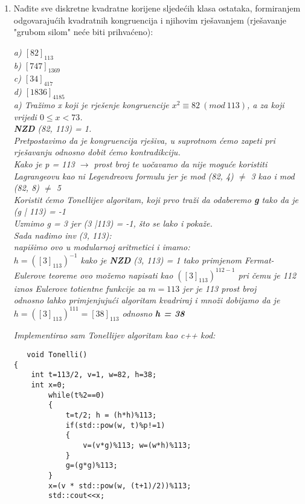 \documentclass[12pt]{article}
\begin{document}
\begin{enumerate}
\begin{center}
	    \end{center}
	    \item Nađite sve diskretne kvadratne korijene sljedećih klasa ostataka, formiranjem odgovarajućih kvadratnih kongruencija i njihovim rješavanjem (rješavanje "grubom silom" neće biti prihvaćeno):
        \begin{center}
        \textit{a) $[82]_{113}$\\b) $ [747]_{1369}$\\c) $[34]_{417}$\\d) $[1836]_{4185}$\\}
        \vspace*{0.75cm}
        \textit{a) Tražimo x koji je rješenje kongruencije $x^2 \equiv 82\ (mod\ 113)$, a za koji vrijedi $0 \leq x < 73$.\\ \textbf{NZD} (82, 113) = 1.\\Pretpostavimo da je kongruencija rješiva, u suprotnom ćemo zapeti pri rješavanju odnosno dobit ćemo kontradikciju.\\ Kako je p = 113 $\rightarrow$ prost broj te uočavamo da nije moguće koristiti Lagrangeovu kao ni Legendreovu formulu jer je mod (82, 4) $\neq$ 3 kao i mod (82, 8) $\neq$ 5\\}
        \textit{Koristit ćemo Tonellijev algoritam, koji prvo traži da odaberemo \textbf{g} tako da je (g | 113) = -1 \\Uzmimo g = 3 jer (3 |113) = -1, što se lako i pokaže.\\Sada nađimo inv (3, 113):\\ napišimo ovo u modularnoj aritmetici i imamo:\\ $h = ([3]_{113})^{-1}$ kako je \textbf{NZD} (3, 113) = 1 tako primjenom Fermat-Eulerove teoreme ovo možemo napisati kao $([3]_{113})^{112-1}$ pri čemu je 112 iznos Eulerove totientne funkcije za $m = 113$ jer je 113 prost broj\\
        odnosno lahko primjenjujući algoritam kvadriraj i množi dobijamo da je $h = ([3]_{113})^{111} = [38]_{113}$ odnosno \textbf{h = 38}\\}
        
        \textit{Implementirao sam Tonellijev algoritam kao c++ kod:\\}
             \vspace*{0.25cm}
             \newpage
                   \begin{lstlisting}
   void Tonelli()                
{
    int t=113/2, v=1, w=82, h=38;
    int x=0;
        while(t%2==0)
        {
            t=t/2; h = (h*h)%113;
            if(std::pow(w, t)%p!=1)
            {
                v=(v*g)%113; w=(w*h)%113;
            }
            g=(g*g)%113;
        }
        x=(v * std::pow(w, (t+1)/2))%113;
        std::cout<<x;
    

\end{lstlisting}
\end{center}
\end{enumerate}
\end{document}
